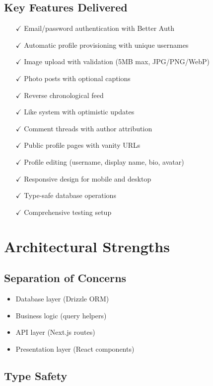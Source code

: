 \documentclass[12pt,a4paper]{report}
\begin{document}
\subsection{Key Features Delivered}

\begin{itemize}
    \item[$\checkmark$] Email/password authentication with Better Auth
    \item[$\checkmark$] Automatic profile provisioning with unique usernames
    \item[$\checkmark$] Image upload with validation (5MB max, JPG/PNG/WebP)
    \item[$\checkmark$] Photo posts with optional captions
    \item[$\checkmark$] Reverse chronological feed
    \item[$\checkmark$] Like system with optimistic updates
    \item[$\checkmark$] Comment threads with author attribution
    \item[$\checkmark$] Public profile pages with vanity URLs
    \item[$\checkmark$] Profile editing (username, display name, bio, avatar)
    \item[$\checkmark$] Responsive design for mobile and desktop
    \item[$\checkmark$] Type-safe database operations
    \item[$\checkmark$] Comprehensive testing setup
\end{itemize}

\section{Architectural Strengths}

\subsection{Separation of Concerns}

\begin{itemize}
    \item Database layer (Drizzle ORM)
    \item Business logic (query helpers)
    \item API layer (Next.js routes)
    \item Presentation layer (React components)
\end{itemize}

\subsection{Type Safety}
\end{document}
